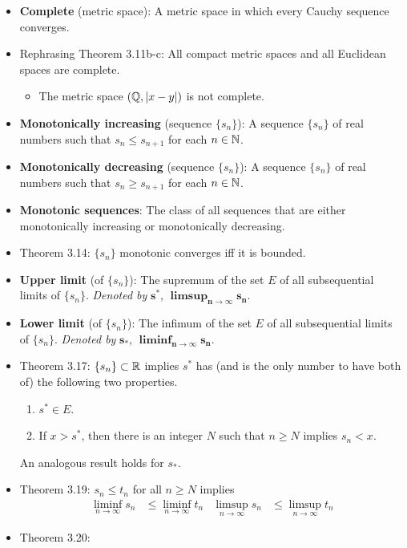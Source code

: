 \documentclass[../../notes.tex]{subfiles}
\begin{document}
\begin{itemize}
\begin{enumerate}[label={(\alph*)}]
    \end{enumerate}
    \item \textbf{Complete} (metric space): A metric space in which every Cauchy sequence converges.
    \item Rephrasing Theorem 3.11b-c: All compact metric spaces and all Euclidean spaces are complete.
    \begin{itemize}
        \item The metric space $(\mathbb{Q},|x-y|)$ is not complete.
    \end{itemize}
    \item \textbf{Monotonically increasing} (sequence $\{s_n\}$): A sequence $\{s_n\}$ of real numbers such that $s_n\leq s_{n+1}$ for each $n\in\mathbb{N}$.
    \item \textbf{Monotonically decreasing} (sequence $\{s_n\}$): A sequence $\{s_n\}$ of real numbers such that $s_n\geq s_{n+1}$ for each $n\in\mathbb{N}$.
    \item \textbf{Monotonic sequences}: The class of all sequences that are either monotonically increasing or monotonically decreasing.
    \item Theorem 3.14: $\{s_n\}$ monotonic converges iff it is bounded.
    \item \textbf{Upper limit} (of $\{s_n\}$): The supremum of the set $E$ of all subsequential limits of $\{s_n\}$. \emph{Denoted by} $\bm{s^*}$, $\bm{\limsup_{n\to\infty}s_n}$.
    \item \textbf{Lower limit} (of $\{s_n\}$): The infimum of the set $E$ of all subsequential limits of $\{s_n\}$. \emph{Denoted by} $\bm{s_*}$, $\bm{\liminf_{n\to\infty}s_n}$.
    \item Theorem 3.17: $\{s_n\}\subset\mathbb{R}$ implies $s^*$ has (and is the only number to have both of) the following two properties.
    \begin{enumerate}[label={(\alph*)}]
        \item $s^*\in E$.
        \item If $x>s^*$, then there is an integer $N$ such that $n\geq N$ implies $s_n<x$.
    \end{enumerate}
    An analogous result holds for $s_*$.
    \item Theorem 3.19: $s_n\leq t_n$ for all $n\geq N$ implies
    \begin{align*}
        \liminf_{n\to\infty}s_n &\leq \liminf_{n\to\infty}t_n&
        \limsup_{n\to\infty}s_n &\leq \limsup_{n\to\infty}t_n
    \end{align*}
    \item Theorem 3.20:

\end{itemize}
\end{document}
